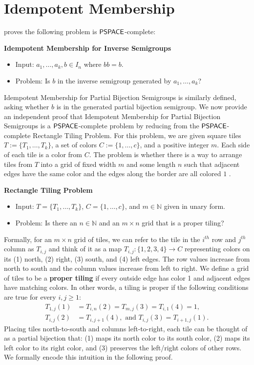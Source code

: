\documentclass{amsart}
\newcommand{\PSPACE}{\ensuremath\mathsf{PSPACE}}
\theoremstyle{remark}
\numberwithin{equation}{section}
\begin{document}
\section{Idempotent Membership}

\cite[Thm 4.10]{TJ:CI} proves the following problem is $\PSPACE$-complete:

\medskip
{\bf Idempotent Membership for Inverse Semigroups}
\begin{itemize}
\item Input: $a_1,\dots,a_k,b \in I_n$ where $bb = b$.
\item Problem: Is $b$ in the inverse semigroup generated by $a_1,\dots,a_k$?
\end{itemize}

Idempotent Membership for Partial Bijection Semigroups is similarly defined, asking whether $b$ is in the generated partial bijection semigroup. We now provide an independent proof that Idempotent Membership for Partial Bijection Semigroups is a $\PSPACE$-complete problem by reducing from the $\PSPACE$-complete Rectangle Tiling Problem. For this problem, we are given square tiles $T := \{T_1,\dots,T_k\}$, a set of colors $C := \{1,\dots,c\}$, and a positive integer $m$. Each side of each tile is a color from $C$. The problem is whether there is a way to arrange tiles from  $T$ into a grid of fixed width $m$ and some length $n$ such that adjacent edges have the same color and the edges along the border are all colored $1$ \cite{CHL:DTG}.

\medskip
{\bf Rectangle Tiling Problem}
\begin{itemize}
\item Input: $T = \{T_1,\dots,T_k\}$, $C = \{1,\dots,c\}$, and $m \in \mathbb{N}$ given in unary form.
\item Problem: Is there an $n \in \mathbb{N}$ and an $m \times n$ grid that is a proper tiling?
\end{itemize}

Formally, for an $m \times n$ grid of tiles, we can refer to the tile in the $i^{th}$ row and $j^{th}$ column as $T_{i,j}$ and think of it as a map $T_{i,j}: \{1,2,3,4\} \to C$ representing colors on its (1) north, (2) right, (3) south, and (4) left edges. The row values increase from north to south and the column values increase from left to right. We define a grid of tiles to be a {\bf proper tiling} if every outside edge has color 1 and adjacent edges have matching colors. In other words, a tiling is proper if the following conditions are true for every $i,j \geq 1$:
\begin{align*}
T_{1,j}(1) &= T_{i,n}(2) = T_{m,j}(3) = T_{i,1}(4) = 1,\\
T_{i,j}(2) &= T_{i,j+1}(4),\text{ and } T_{i,j}(3) = T_{i+1,j}(1).
\end{align*}
Placing tiles north-to-south and columns left-to-right, each tile can be thought of as a partial bijection that: (1) maps its north color to its south color, (2) maps its left color to its right color, and (3) preserves the left/right colors of other rows. We formally encode this intuition in the following proof.
\end{document}
